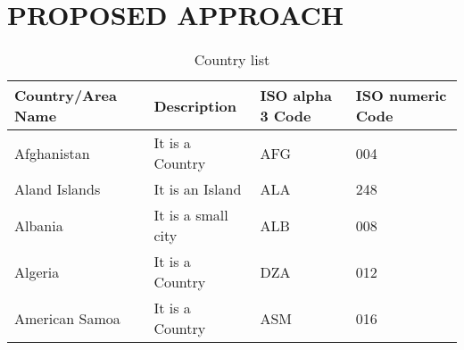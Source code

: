 \chapter{\uppercase{Proposed Approach}}


\begin{table}[h!]
\centering
\caption{Country list}
\renewcommand{\arraystretch}{1.3} %
\begin{tabular}{|l|l|l|l|}
\hline
\textbf{Country/Area Name} & \textbf{Description} & \textbf{ISO alpha 3 Code} & \textbf{ISO numeric Code} \\
\hline
Afghanistan & It is a Country & AFG & 004 \\
Aland Islands & It is an Island & ALA & 248 \\
Albania & It is a small city & ALB & 008 \\
Algeria & It is a Country & DZA & 012 \\
American Samoa & It is a Country & ASM & 016 \\
\hline
\end{tabular}
\end{table}

\vspace{1em}

\begin{table}[h!]
\centering
\caption{Data units, sources, and dates}
\renewcommand{\arraystretch}{1.3}
\end{table}